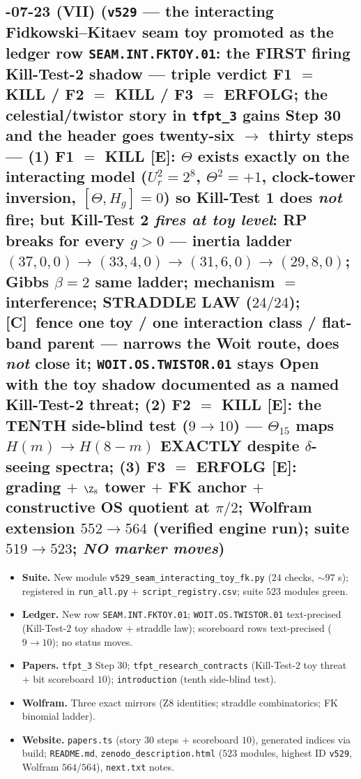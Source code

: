 \documentclass[11pt]{article}
\providecommand{\mE}{\textbf{[E]}}\providecommand{\mC}{\textbf{[C]}}
\begin{document}
\subsection*{-07-23 (VII) (\texttt{v529} --- the interacting Fidkowski--Kitaev seam toy promoted as the ledger row \texttt{SEAM.INT.FKTOY.01}: the FIRST firing Kill-Test-2 shadow --- triple verdict F1 $=$ KILL / F2 $=$ KILL / F3 $=$ ERFOLG; the celestial/twistor story in \texttt{tfpt\_3} gains Step 30 and the header goes twenty-six $\to$ thirty steps --- (1) F1 $=$ KILL \mE: $\Theta$ exists exactly on the interacting model ($U_r^2=2^8$, $\Theta^2=+1$, clock-tower inversion, $[\Theta,H_g]=0$) so Kill-Test 1 does \emph{not} fire; but Kill-Test 2 \emph{fires at toy level}: RP breaks for every $g>0$ --- inertia ladder $(37,0,0)\to(33,4,0)\to(31,6,0)\to(29,8,0)$; Gibbs $\beta=2$ same ladder; mechanism $=$ interference; STRADDLE LAW ($24/24$); \mC\ fence one toy / one interaction class / flat-band parent --- narrows the Woit route, does \emph{not} close it; \texttt{WOIT.OS.TWISTOR.01} stays Open with the toy shadow documented as a named Kill-Test-2 threat; (2) F2 $=$ KILL \mE: the TENTH side-blind test ($9\to10$) --- $\Theta_{15}$ maps $H(m)\to H(8-m)$ EXACTLY despite $\delta$-seeing spectra; (3) F3 $=$ ERFOLG \mE: grading $+$ $\Z_8$ tower $+$ FK anchor $+$ constructive OS quotient at $\pi/2$; Wolfram extension $552\to564$ (verified engine run); suite $519\to523$; \emph{NO marker moves})}
\begin{itemize}[leftmargin=1.5em]
\item \textbf{Suite.} New module \texttt{v529\_seam\_interacting\_toy\_fk.py} ($24$ checks, $\sim97$ s);
registered in \texttt{run\_all.py} $+$ \texttt{script\_registry.csv}; suite $523$ modules green.
\item \textbf{Ledger.} New row \texttt{SEAM.INT.FKTOY.01}; \texttt{WOIT.OS.TWISTOR.01} text-precised
(Kill-Test-2 toy shadow $+$ straddle law); scoreboard rows text-precised ($9\to10$); no status moves.
\item \textbf{Papers.} \texttt{tfpt\_3} Step 30; \texttt{tfpt\_research\_contracts} (Kill-Test-2 toy
threat $+$ bit scoreboard $10$); \texttt{introduction} (tenth side-blind test).
\item \textbf{Wolfram.} Three exact mirrors (Z8 identities; straddle combinatorics; FK binomial ladder).
\item \textbf{Website.} \texttt{papers.ts} (story $30$ steps $+$ scoreboard $10$), generated indices via build;
\texttt{README.md}, \texttt{zenodo\_description.html} ($523$ modules, highest ID \texttt{v529}, Wolfram $564/564$),
\texttt{next.txt} notes.
\end{itemize}
\end{document}
